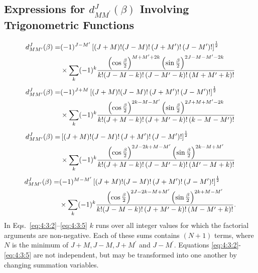 \subsection{Expressions for $d_{M M^{\prime}}^{J}(\beta)$ Involving Trigonometric Functions}\label{sec:4.3.1}
\begin{align}
d_{M M^{\prime}}^{J}(\beta)=&(-1)^{J-M^{\prime}}\left[(J+M)!(J-M)!\left(J+M^{\prime}\right)!\left(J-M^{\prime}\right)!\right]^{\frac{1}{2}}  \notag\\
&\times \sum_{k}(-1)^{k} \frac{\left(\cos \frac{\beta}{2}\right)^{M+M^{\prime}+2 k}\left(\sin \frac{\beta}{2}\right)^{2 J-M-M^{\prime}-2 k}}{k!(J-M-k)!\left(J-M^{\prime}-k\right)!\left(M+M^{\prime}+k\right)!}  \label{eq:4:3:2}
\end{align}\begin{align}
d_{M M^{\prime}}^{J}(\beta)=&(-1)^{J+M}\left[(J+M)!(J-M)!\left(J+M^{\prime}\right)!\left(J-M^{\prime}\right)!\right]^{\frac{1}{2}}  \notag\\
&\times \sum_{k}(-1)^{k} \frac{\left(\cos \frac{\beta}{2}\right)^{2 k-M-M^{\prime}}\left(\sin \frac{\beta}{2}\right)^{2 J+M+M^{\prime}-2 k}}{k!(J+M-k)!\left(J+M^{\prime}-k\right)!\left(k-M-M^{\prime}\right)!}  \label{eq:4:3:3}
\end{align}\begin{align}
d_{M M^{\prime}}^{J}(\beta)=&\left[(J+M)!(J-M)!\left(J+M^{\prime}\right)!\left(J-M^{\prime}\right)!\right]^{\frac{1}{2}}  \notag\\
&\times \sum_{k}(-1)^{k} \frac{\left(\cos \frac{\beta}{2}\right)^{2 J-2 k+M-M^{\prime}}\left(\sin \frac{\beta}{2}\right)^{2 k-M+M^{\prime}}}{k!(J+M-k)!\left(J-M^{\prime}-k\right)!\left(M^{\prime}-M+k\right)!} \label{eq:4:3:4}
\end{align}
\begin{align}
 d_{M M^{\prime}}^{J}(\beta)=&(-1)^{M-M^{\prime}}\left[(J+M)!(J-M)!\left(J+M^{\prime}\right)!\left(J-M^{\prime}\right)!\right]^{\frac{1}{2}}  \notag\\
&  \times \sum_{k}(-1)^{k} \frac{\left(\cos \frac{\beta}{2}\right)^{2 J-2 k-M+M^{\prime}}\left(\sin \frac{\beta}{2}\right)^{2 k+M-M^{\prime}}}{k!(J-M-k)!\left(J+M^{\prime}-k\right)!\left(M-M^{\prime}+k\right)!}. \label{eq:4:3:5}
\end{align}
In Eqs.~\eqref{eq:4:3:2}--\eqref{eq:4:3:5} $k$ runs over all integer values for which the factorial arguments are non-negative. Each of these sums contains $(N+1)$ terms, where $N$ is the minimum of $J+M, J-M, J+M^{\prime}$ and $J-M^{\prime}$. Equations \eqref{eq:4:3:2}-\eqref{eq:4:3:5} are not independent, but may be transformed into one another by changing summation variables.

